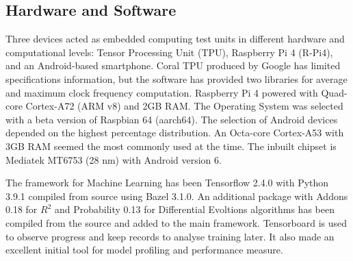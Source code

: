 \subsection{Hardware and Software} \label{subsec:soft}

%
Three devices acted as embedded computing test units in different hardware and computational levels: Tensor Processing Unit (TPU), Raspberry Pi 4 (R-Pi4), and an Android-based smartphone.
Coral TPU produced by Google has limited specifications information, but the software has provided two libraries for average and maximum clock frequency computation.
Raspberry Pi 4 powered with Quad-core Cortex-A72 (ARM v8) and 2GB RAM.
The Operating System was selected with a beta version of Raspbian 64 (aarch64).
The selection of Android devices depended on the highest percentage distribution.
An Octa-core Cortex-A53 with 3GB RAM seemed the most commonly used at the time.
The inbuilt chipset is Mediatek MT6753 (28 nm) with Android version 6.

%
The framework for Machine Learning has been Tensorflow 2.4.0 with Python 3.9.1 compiled from source using Bazel 3.1.0.
An additional package with Addons 0.18 for $R^2$ and Probability 0.13 for Differential Evoltions algorithms has been compiled from the source and added to the main framework.
Tensorboard is used to observe progress and keep records to analyse training later. It also made an excellent initial tool for model profiling and performance measure.

